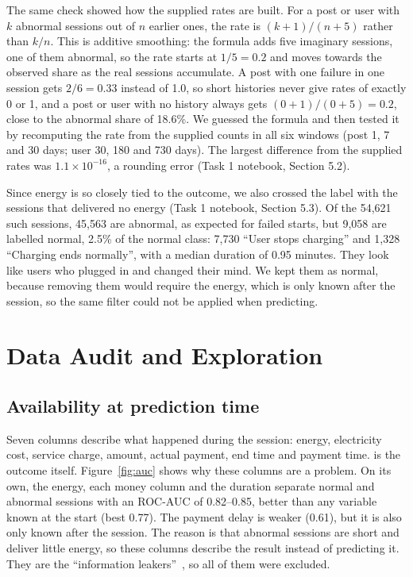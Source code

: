 \documentclass[12pt,a4paper,openany]{report}
\begin{document}
The same check showed how the supplied rates are built. For a post or user with $k$ abnormal sessions out of $n$
earlier ones, the rate is $(k+1)/(n+5)$ rather than $k/n$. This is additive smoothing: the formula adds five
imaginary sessions, one of them abnormal, so the rate starts at $1/5 = 0.2$ and moves towards the observed share as
the real sessions accumulate. A post with one failure in one session gets $2/6 = 0.33$ instead of 1.0, so short
histories never give rates of exactly 0 or 1, and a post or user with no history always gets $(0+1)/(0+5) = 0.2$,
close to the abnormal share of 18.6\%. We guessed the formula and then tested it by recomputing the rate from
the supplied counts in all six windows (post 1, 7 and 30 days; user 30, 180 and 730 days). The
largest difference from the supplied rates was $1.1\times10^{-16}$, a rounding error (Task 1 notebook, Section 5.2).

Since energy is so closely tied to the outcome, we also crossed the label with the sessions that delivered no
energy (Task 1 notebook, Section 5.3). Of the 54,621 such sessions, 45,563 are abnormal, as expected for failed
starts, but 9,058 are labelled normal, 2.5\% of the normal class: 7,730 ``User stops charging'' and 1,328
``Charging ends normally'', with a median duration of 0.95 minutes. They look like users who plugged in and changed
their mind. We kept them as normal, because removing them would require the energy, which is only known after the
session, so the same filter could not be applied when predicting.

\chapter{Data Audit and Exploration}\label{ch:audit}

\section{Availability at prediction time}\label{sec:leakage}

Seven columns describe what happened during the session: energy, electricity cost, service charge, amount,
actual payment, end time and payment time.  is the outcome itself. Figure~\ref{fig:auc} shows why
these columns are a problem. On its own, the energy, each money column and the duration separate normal and
abnormal sessions with an \ac{ROC-AUC} of 0.82--0.85, better than any variable known at the start (best 0.77). The
payment delay is weaker (0.61), but it is also only known after the session. The reason is that abnormal sessions
are short and deliver little energy, so these columns describe the result instead of predicting it. They are the
``information leakers''~\cite{mindd03}, so all of them were excluded.
\end{document}
